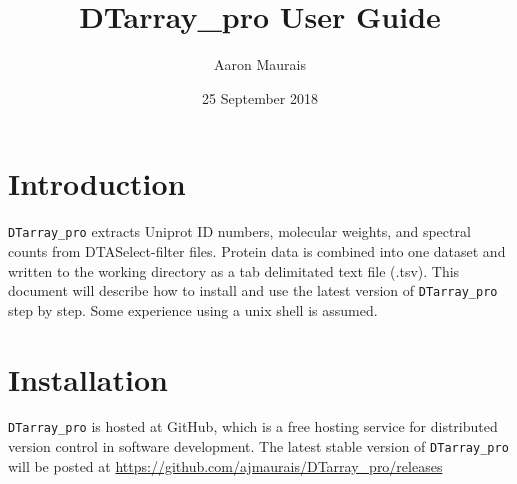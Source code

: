 \documentclass[12pt]{article}
\begin{document}
	
	\title{DTarray\_pro User Guide}
	\author{Aaron Maurais}
	\date{25 September 2018}
	
	\maketitle
	\tableofcontents
	\newpage
	
	
	\section{Introduction}
	
	\texttt{DTarray\_pro} extracts Uniprot ID numbers, molecular weights, and spectral counts from DTASelect-filter files. Protein data is combined into one dataset and written to the working directory as a tab delimitated text file (.tsv). This document will describe how to install and use the latest version of \texttt{DTarray\_pro} step by step. Some experience using a unix shell is assumed.  
	
	
	\section{Installation}
	
	\texttt{DTarray\_pro} is hosted at GitHub, which is a free hosting service for distributed version control in software development.  
	The latest stable version of \texttt{DTarray\_pro} will be posted at \url{https://github.com/ajmaurais/DTarray_pro/releases}
	
\end{document}
